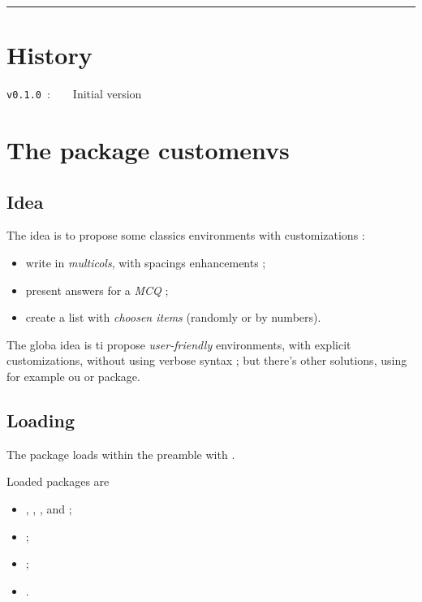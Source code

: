 \documentclass[english,11pt,a4paper]{article}
\begin{document}
\hrule

\vfill

\section{History}

\verb|v0.1.0|~:~~~~Initial version

\vspace*{5mm}

\pagebreak

\section{The package customenvs}

\subsection{Idea}

The idea is to propose some classics environments with customizations :

\begin{itemize}
	\item write in \textit{multicols}, with spacings enhancements ;
	\item present answers for a \textit{MCQ} ;
	\item create a list with \textit{choosen items} (randomly or by numbers).
\end{itemize}

\smallskip

The globa idea is ti propose \textit{user-friendly} environments, with explicit customizations, without using verbose syntax ; but there's other solutions, using for example  ou  or  package.

\subsection{Loading}

The package loads within the preamble with .

Loaded packages are 

\begin{itemize}
	\item {}, , ,  and  ;
	\item {} ;
	\item {} ;
	\item {}.
\end{itemize}
\end{document}
